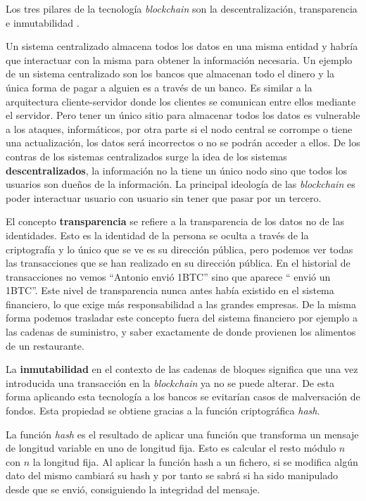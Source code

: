 Los tres pilares de la tecnología \textit{blockchain} son la descentralización, transparencia e inmutabilidad \cite{pilares-blockchain}.

Un sistema centralizado almacena todos los datos en una misma entidad y habría que interactuar con la misma para obtener la información necesaria. Un ejemplo de un sistema centralizado son los bancos que almacenan todo el dinero y la única forma de pagar a alguien es a través de un banco. Es similar a la arquitectura cliente-servidor donde los clientes se comunican entre ellos mediante el servidor. Pero tener un único sitio para almacenar todos los datos es vulnerable a los ataques, informáticos, por otra parte si el nodo central se corrompe o tiene una actualización, los datos será incorrectos o no se podrán acceder a ellos. De los contras de los sistemas centralizados surge la idea de los sistemas \textbf{descentralizados}, la información no la tiene un único nodo sino que todos los usuarios son dueños de la información. La principal ideología de las \textit{blockchain} es poder interactuar usuario con usuario sin tener que pasar por un tercero.

El concepto \textbf{transparencia} se refiere a la transparencia de los datos no de las identidades. Esto es la identidad de la persona se oculta a través de la criptografía y lo único que se ve es su dirección pública, pero podemos ver todas las transacciones que se han realizado en su dirección pública. En el historial de transacciones no vemos ``Antonio envió 1BTC'' sino que aparece `` envió un 1BTC''. Este nivel de transparencia nunca antes había existido en el sistema financiero, lo que exige más responsabilidad a las grandes empresas. De la misma forma podemos trasladar este concepto fuera del sistema financiero por ejemplo a las cadenas de suministro, y saber exactamente de donde provienen los alimentos de un restaurante.

La \textbf{inmutabilidad} en el contexto de las cadenas de bloques significa que una vez introducida una transacción en la \textit{blockchain} ya no se puede alterar. De esta forma aplicando esta tecnología a los bancos se evitarían casos de malversación de fondos. Esta propiedad se obtiene gracias a la función criptográfica \textit{hash}.

La función \textit{hash} es el resultado de aplicar una función que transforma un mensaje de longitud variable en uno de longitud fija. Esto es calcular el resto módulo $n$ con $n$ la longitud fija. Al aplicar la función hash a un fichero, si se modifica algún dato del mismo cambiará su hash y por tanto se sabrá si ha sido manipulado desde que se envió, consiguiendo la integridad del mensaje.


